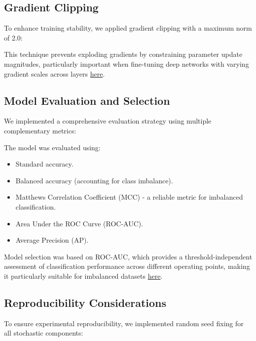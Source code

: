\documentclass[a4paper,12pt]{article}
\begin{document}
\subsection{Gradient Clipping}
To enhance training stability, we applied gradient clipping with a maximum norm of 2.0:


This technique prevents exploding gradients by constraining parameter update magnitudes, particularly important when fine-tuning deep networks with varying gradient scales across layers \href{http://proceedings.mlr.press/v28/pascanu13.pdf}{here}.

\subsection{Model Evaluation and Selection}
We implemented a comprehensive evaluation strategy using multiple complementary metrics:


The model was evaluated using:
\begin{itemize}
    \item Standard accuracy.
    \item Balanced accuracy (accounting for class imbalance).
    \item Matthews Correlation Coefficient (MCC) - a reliable metric for imbalanced classification.
    \item Area Under the ROC Curve (ROC-AUC).
    \item Average Precision (AP).
\end{itemize}

Model selection was based on ROC-AUC, which provides a threshold-independent assessment of classification performance across different operating points, making it particularly suitable for imbalanced datasets \href{https://dl.acm.org/doi/10.1145/1143844.1143874}{here}.

\subsection{Reproducibility Considerations}
To ensure experimental reproducibility, we implemented random seed fixing for all stochastic components:
\end{document}
